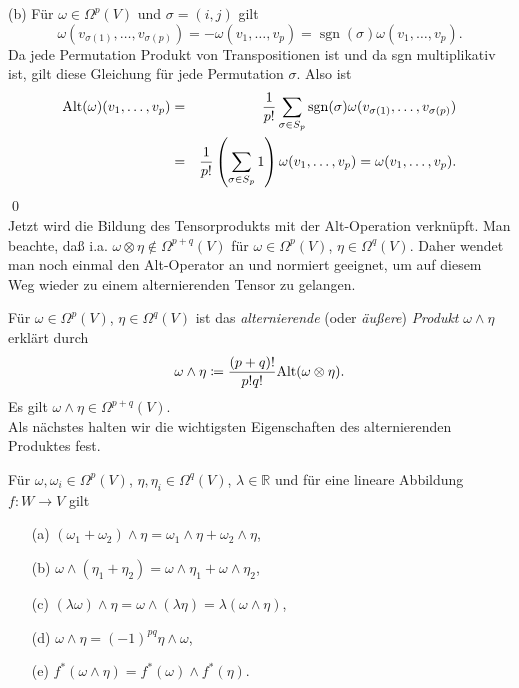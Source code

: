 \documentclass[a4paper,twoside,DIV15,BCOR12mm]{scrbook}
\DeclareMathOperator{\sgn}{sgn}
\begin{document}
\noindent
(b) Für $\omega \in \Omega^{p}(V)$ und $\sigma = (i,j)$ gilt
\[ \omega(v_{\sigma(1)},\dots,v_{\sigma(p)}) = 
-\omega(v_{1},\dots,v_{p}) = \sgn (\sigma) 
\omega(v_{1},\dots,v_{p}). \]
Da jede Permutation Produkt von Transpositionen ist und da sgn 
multiplikativ ist, gilt diese Gleichung für jede Permutation 
$\sigma$. Also ist
\begin{eqnarray*}
{\rm Alt}(\omega)(v_{1},\dots,v_{p}) & = & \frac{1}{p!} \sum_{\sigma 
\in S_{p}} \sgn (\sigma) 
\omega(v_{\sigma(1)},\dots,v_{\sigma(p)}) \\
& = & \frac{1}{p!} \left(\sum_{\sigma \in S_{p}} 1\right) 
\omega(v_{1},\dots,v_{p}) = \omega(v_{1},\dots,v_{p}).
\end{eqnarray*}
\qed\\

\noindent
Jetzt wird die Bildung des Tensorprodukts mit der Alt-Operation 
verknüpft. Man beachte, daß i.a. $\omega \otimes \eta \notin 
\Omega^{p+q}(V)$ für $\omega \in \Omega^{p}(V)$, $\eta \in 
\Omega^{q}(V)$. Daher wendet man noch einmal den Alt-Operator an und 
normiert geeignet, um auf diesem Weg wieder zu einem alternierenden Tensor 
zu gelangen.

\bigskip

 Für $\omega \in \Omega^{p}(V)$, $\eta 
\in \Omega^{q}(V)$ ist das {\em alternierende} (oder {\em äußere}) 
{\em Produkt} $\omega \wedge \eta$ erklärt durch
\[ \omega \wedge \eta \da  \frac{(p+q)!}{p!q!} {\rm Alt}(\omega \otimes 
\eta). \]
Es gilt $\omega \wedge \eta \in \Omega^{p+q}(V)$.\\


\noindent Als nächstes halten wir die wichtigsten Eigenschaften des 
alternierenden Produktes fest.\\



\begin{satz}\label{Satz3.3.3} {Für $\omega, \omega_{i} \in 
\Omega^{p}(V)$, $\eta, \eta_{i} \in \Omega^{q}(V)$, $\lambda \in 
{\mathbb R}$ und für eine lineare Abbildung $f: W \to V$ gilt}
\begin{enumerate}
\item[{\rm (a)}] $(\omega_{1} + \omega_{2}) \wedge \eta = \omega_{1} \wedge 
\eta + \omega_{2} \wedge \eta$,
\item[{\rm (b)}] $\omega \wedge (\eta_{1} + \eta_{2}) = \omega \wedge \eta_{1} + 
\omega \wedge \eta_{2}$, 
\item[{\rm (c)}] $(\lambda \omega) \wedge \eta = \omega \wedge (\lambda \eta) = 
\lambda(\omega \wedge \eta)$,
\item[{\rm (d)}] $\omega \wedge \eta = (-1)^{pq} \eta \wedge \omega$,
\item[{\rm (e)}] $f^{*}(\omega \wedge \eta) = f^{*}(\omega) \wedge f^{*}(\eta)$.
\end{enumerate}
\end{satz}
\end{document}
